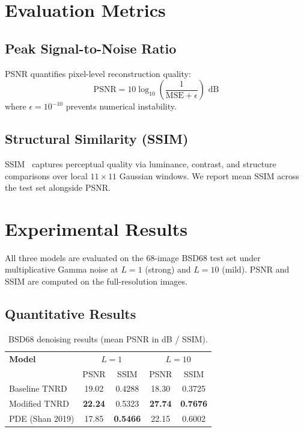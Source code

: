 \documentclass[10pt,conference]{IEEEtran}
\begin{document}
\section{Evaluation Metrics}

\subsection{Peak Signal-to-Noise Ratio}

PSNR quantifies pixel-level reconstruction quality:
\begin{equation}
\text{PSNR} = 10 \log_{10}\!\left(\frac{1}{\text{MSE} + \epsilon}\right) \text{ dB}
\end{equation}
where $\epsilon = 10^{-10}$ prevents numerical instability.

\subsection{Structural Similarity (SSIM)}

SSIM~\cite{martin2006} captures perceptual quality via luminance, contrast, and
structure comparisons over local $11{\times}11$ Gaussian windows.  We report
mean SSIM across the test set alongside PSNR.

\section{Experimental Results}

All three models are evaluated on the 68-image BSD68 test set under
multiplicative Gamma noise at $L{=}1$ (strong) and $L{=}10$ (mild).  PSNR and
SSIM are computed on the full-resolution images.

\subsection{Quantitative Results}

\begin{table}[htbp]
\centering
\caption{BSD68 denoising results (mean PSNR in dB / SSIM).}
\label{tab:results}
\begin{tabular}{lcccc}
\hline
\textbf{Model} & \multicolumn{2}{c}{$L{=}1$} & \multicolumn{2}{c}{$L{=}10$} \\
               & PSNR & SSIM & PSNR & SSIM \\
\hline
Baseline TNRD       & 19.02 & 0.4288 & 18.30 & 0.3725 \\
Modified TNRD       & \textbf{22.24} & 0.5323 & \textbf{27.74} & \textbf{0.7676} \\
PDE (Shan 2019)     & 17.85 & \textbf{0.5466} & 22.15 & 0.6002 \\
\hline
\end{tabular}
\end{table}
\end{document}
